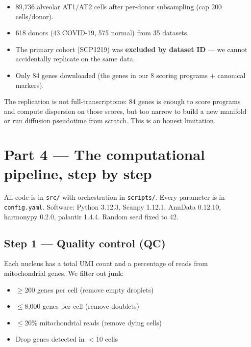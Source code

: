 \documentclass[11pt]{article}
\begin{document}
\begin{itemize}
\item 89{,}736 alveolar AT1/AT2 cells after per-donor subsampling (cap 200 cells/donor).
\item 618 donors (43 COVID-19, 575 normal) from 35 datasets.
\item The primary cohort (SCP1219) was \textbf{excluded by dataset ID} --- we cannot accidentally replicate on the same data.
\item Only 84 genes downloaded (the genes in our 8 scoring programs + canonical markers).
\end{itemize}

\begin{pitfall}
The replication is not full-transcriptome: 84 genes is enough to score programs and compute dispersion on those scores, but too narrow to build a new manifold or run diffusion pseudotime from scratch. This is an honest limitation.
\end{pitfall}


\section{Part 4 --- The computational pipeline, step by step}

All code is in \texttt{src/} with orchestration in \texttt{scripts/}. Every parameter is in \texttt{config.yaml}. Software: Python 3.12.3, Scanpy 1.12.1, AnnData 0.12.10, harmonypy 0.2.0, palantir 1.4.4. Random seed fixed to 42.

\subsection{Step 1 --- Quality control (QC)}

Each nucleus has a total UMI count and a percentage of reads from mitochondrial genes. We filter out junk:

\begin{itemize}
\item $\geq$200 genes per cell (remove empty droplets)
\item $\leq$8{,}000 genes per cell (remove doublets)
\item $\leq$20\% mitochondrial reads (remove dying cells)
\item Drop genes detected in $<$10 cells
\end{itemize}
\end{document}
